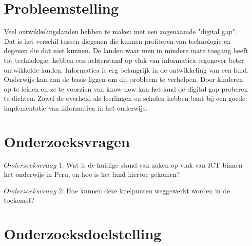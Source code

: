 \section{Probleemstelling}
\label{sec:probleemstelling}
Veel ontwikkelingslanden hebben te maken met een zogenaamde "digital gap". Dat is het verschil tussen diegenen die kunnen profiteren van technologie en degenen die dat niet kunnen. De landen waar men in mindere mate toegang heeft tot technologie, hebben een achterstand op vlak van informatica tegenover beter ontwikkelde landen. Informatica is erg belangrijk in de ontwikkeling van een land. Onderwijs kan aan de basis liggen om dit probleem te verhelpen. Door kinderen op te leiden en ze te voorzien van know-how kan het land de digital gap proberen te dichten. Zowel de overheid als leerlingen en scholen hebben baat bij een goede implementatie van informatica in het onderwijs. \autocite{WereldBank2018}


\section{Onderzoeksvragen}
\label{sec:onderzoeksvraag}


$Onderzoeksvraag$ 1: Wat is de huidige stand van zaken op vlak van ICT binnen het onderwijs in Peru, en hoe is het land hiertoe gekomen?

$Onderzoeksvraag$ 2: Hoe kunnen deze knelpunten weggewerkt worden in de toekomst?

\section{Onderzoeksdoelstelling}
\label{sec:onderzoeksdoelstelling}

